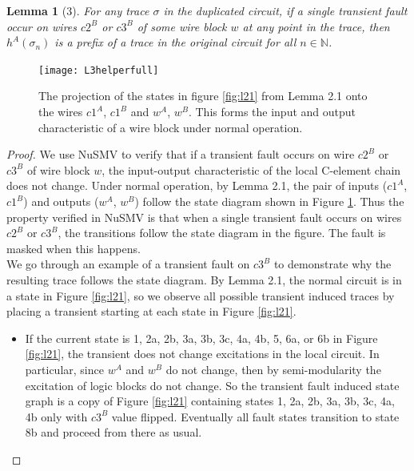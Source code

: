 \documentclass[12pt]{report}
\newtheorem*{lemma}{Lemma}
\begin{document}
\begin{lemma}[3]
For any trace $\sigma$ in the duplicated circuit, if a single transient fault occur on wires $c2^B$ or $c3^B$ of some wire block $w$ at any point in the trace, then $h^{A}(\sigma_n)$ is a prefix of a trace in the original circuit for all $n \in \mathbb{N}$.
\end{lemma}
\begin{figure}
  \centering
    \texttt{[image: L3helperfull]}
  \caption{The projection of the states in figure \ref{fig:l21} from Lemma 2.1 onto the wires $c1^A$, $c1^B$ and $w^A$, $w^B$.  This forms the input and output characteristic of a wire block under normal operation.}
  \label{fig:l3helper}
\end{figure}

\begin{proof}
We use NuSMV to verify that if a transient fault occurs on wire $c2^B$ or $c3^B$ of wire block $w$, the input-output characteristic of the local C-element chain does not change.  Under normal operation, by Lemma 2.1, the pair of inputs ($c1^A$, $c1^B$) and outputs ($w^A$, $w^B$) follow the state diagram shown in Figure \ref{fig:l3helper}.  Thus the property verified in NuSMV is that when a single transient fault occurs on wires $c2^B$ or $c3^B$, the transitions follow the state diagram in the figure.  The fault is masked when this happens. \\
We go through an example of a transient fault on $c3^B$ to demonstrate why the resulting trace follows the state diagram.  By Lemma 2.1, the normal circuit is in a state in Figure \ref{fig:l21}, so we observe all possible transient induced traces by placing a transient starting at each state in Figure \ref{fig:l21}.
\begin{itemize}
	\item
If the current state is 1, 2a, 2b, 3a, 3b, 3c, 4a, 4b, 5, 6a, or 6b in Figure \ref{fig:l21}, the transient does not change excitations in the local circuit.  In particular, since $w^A$ and $w^B$ do not change, then by semi-modularity the excitation of logic blocks do not change.  So the transient fault induced state graph is a copy of Figure \ref{fig:l21} containing states 1, 2a, 2b, 3a, 3b, 3c, 4a, 4b only with $c3^B$ value flipped. Eventually all fault states transition to state 8b and proceed from there as usual.

\end{itemize}
\end{proof}
\end{document}
